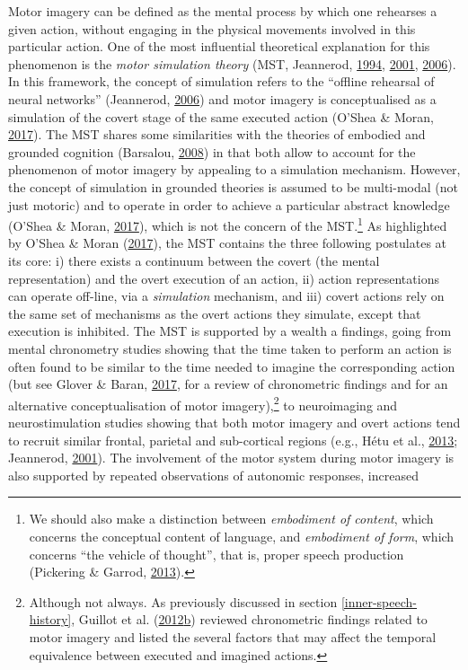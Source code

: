 \documentclass[a4paper,12pt,twoside,onecolumn,openright,final,oldfontcommands]{memoir}
\let\rmarkdownfootnote\footnote%
\def\footnote{\protect\rmarkdownfootnote}
\begin{document}
Motor imagery can be defined as the mental process by which one rehearses a given action, without engaging in the physical movements involved in this particular action. One of the most influential theoretical explanation for this phenomenon is the \emph{motor simulation theory} (MST, Jeannerod, \protect\hyperlink{ref-jeannerod_representing_1994}{1994}, \protect\hyperlink{ref-jeannerod_neural_2001}{2001}, \protect\hyperlink{ref-jeannerod_motor_2006}{2006}). In this framework, the concept of simulation refers to the \enquote{offline rehearsal of neural networks} (Jeannerod, \protect\hyperlink{ref-jeannerod_motor_2006}{2006}) and motor imagery is conceptualised as a simulation of the covert stage of the same executed action (O'Shea \& Moran, \protect\hyperlink{ref-oshea_does_2017}{2017}). The MST shares some similarities with the theories of embodied and grounded cognition (Barsalou, \protect\hyperlink{ref-Barsalou2008}{2008}) in that both allow to account for the phenomenon of motor imagery by appealing to a simulation mechanism. However, the concept of simulation in grounded theories is assumed to be multi-modal (not just motoric) and to operate in order to achieve a particular abstract knowledge (O'Shea \& Moran, \protect\hyperlink{ref-oshea_does_2017}{2017}), which is not the concern of the MST.\footnote{We should also make a distinction between \emph{embodiment of content}, which concerns the conceptual content of language, and \emph{embodiment of form}, which concerns \enquote{the vehicle of thought}, that is, proper speech production (Pickering \& Garrod, \protect\hyperlink{ref-pickering_integrated_2013}{2013}).} As highlighted by O'Shea \& Moran (\protect\hyperlink{ref-oshea_does_2017}{2017}), the MST contains the three following postulates at its core: i) there exists a continuum between the covert (the mental representation) and the overt execution of an action, ii) action representations can operate off-line, via a \emph{simulation} mechanism, and iii) covert actions rely on the same set of mechanisms as the overt actions they simulate, except that execution is inhibited. The MST is supported by a wealth a findings, going from mental chronometry studies showing that the time taken to perform an action is often found to be similar to the time needed to imagine the corresponding action (but see Glover \& Baran, \protect\hyperlink{ref-glover_motor-cognitive_2017}{2017}, for a review of chronometric findings and for an alternative conceptualisation of motor imagery),\footnote{Although not always. As previously discussed in section \ref{inner-speech-history}, Guillot et al. (\protect\hyperlink{ref-guillot_understanding_2012}{2012}\protect\hyperlink{ref-guillot_understanding_2012}{b}) reviewed chronometric findings related to motor imagery and listed the several factors that may affect the temporal equivalence between executed and imagined actions.} to neuroimaging and neurostimulation studies showing that both motor imagery and overt actions tend to recruit similar frontal, parietal and sub-cortical regions (e.g., Hétu et al., \protect\hyperlink{ref-hetu_neural_2013}{2013}; Jeannerod, \protect\hyperlink{ref-jeannerod_neural_2001}{2001}). The involvement of the motor system during motor imagery is also supported by repeated observations of autonomic responses, increased 
\end{document}
